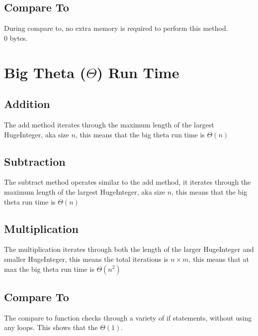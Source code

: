 \documentclass[12pt, letterpaper, titlepage, hidelinks]{article}
\begin{document}
	\subsection{Compare To}
		During compare to, no extra memory is required to perform this method.\\
\indent		$0$ bytes.

\section{Big Theta ($\Theta$) Run Time}
\subsection{Addition}
The add method iterates through the maximum length of the largest HugeInteger, aka size $n$, this means that the big theta run time is $\Theta(n)$
\subsection{Subtraction}
The subtract method operates similar to the add method, it iterates through the maximum length of the largest HugeInteger, aka size $n$, this means that the big theta run time is $\Theta(n)$
\subsection{Multiplication}
The multiplication iterates through both the length of the larger HugeInteger and smaller HugeInteger, this means the total iterations is $n\times m$, this means that at max the big theta run time is $\Theta(n^2)$
\subsection{Compare To}
The compare to function checks through a variety of if statements, without using any loops. This shows that the $\Theta(1)$.
\newpage
\end{document}
